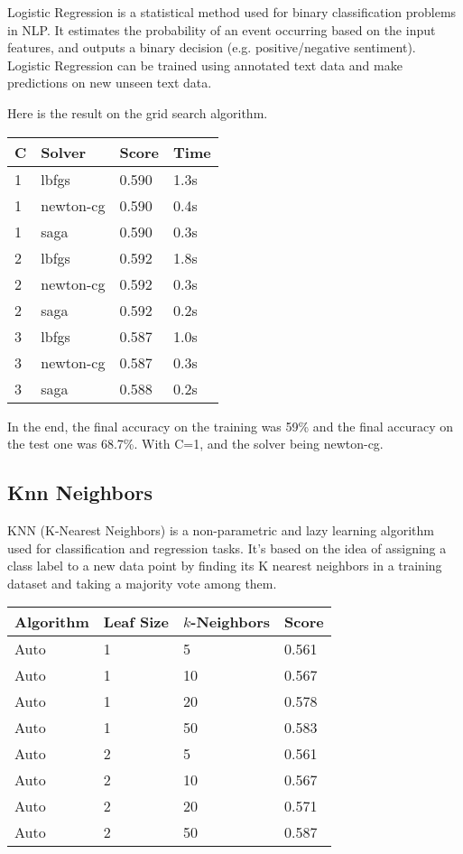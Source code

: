 \documentclass[11pt, a4paper]{article}
\begin{document}
\begin{large}
Logistic Regression is a statistical method used for binary classification problems in NLP. It estimates the probability of an event occurring based on the input features, and outputs a binary decision (e.g. positive/negative sentiment). Logistic Regression can be trained using annotated text data and make predictions on new unseen text data.

Here is the result on the grid search algorithm.

\begin{center}
\begin{tabular}{|l|l|l|l|}
\hline
C & Solver & Score & Time \\ \hline
1 & lbfgs & 0.590 & 1.3s \\ \hline
1 & newton-cg & 0.590 & 0.4s \\ \hline
1 & saga & 0.590 & 0.3s \\ \hline
2 & lbfgs & 0.592 & 1.8s \\ \hline
2 & newton-cg & 0.592 & 0.3s \\ \hline
2 & saga & 0.592 & 0.2s \\ \hline
3 & lbfgs & 0.587 & 1.0s \\ \hline
3 & newton-cg & 0.587 & 0.3s \\ \hline
3 & saga & 0.588 & 0.2s \\ \hline
\end{tabular}
\end{center}

In the end, the final accuracy on the training  was 59\% and the final accuracy on the test one was 68.7\%.  With C=1, and the solver being newton-cg.

\subsection{Knn Neighbors}

KNN (K-Nearest Neighbors) is a non-parametric and lazy learning algorithm used for classification and regression tasks. It's based on the idea of assigning a class label to a new data point by finding its K nearest neighbors in a training dataset and taking a majority vote among them.

\begin{center}
\begin{tabular}{|l|l|l|l|}
\hline
Algorithm & Leaf Size & $k$-Neighbors & Score \\ \hline
Auto & 1 & 5 & 0.561 \\
\hline
Auto & 1 & 10 & 0.567 \\
\hline
Auto & 1 & 20 & 0.578 \\
\hline
Auto & 1 & 50 & 0.583 \\
\hline
Auto & 2 & 5 & 0.561 \\
\hline
Auto & 2 & 10 & 0.567 \\
\hline
Auto & 2 & 20 & 0.571 \\
\hline
Auto & 2 & 50 & 0.587 \\
\hline
\end{tabular}
\end{center}


\end{large}
\end{document}
